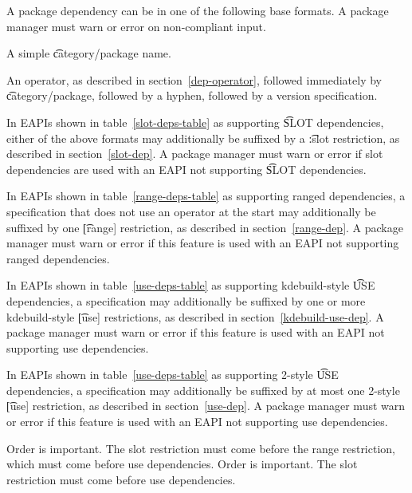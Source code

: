 A package dependency can be in one of the following base formats. A package manager must warn or
error on non-compliant input.

\begin{compactitem}
\item A simple \t{category/package} name.
\item An operator, as described in section~\ref{dep-operator}, followed immediately by
    \t{category/package}, followed by a hyphen, followed by a version specification.
\end{compactitem}

In EAPIs shown in table~\ref{slot-deps-table} as supporting \t{SLOT} dependencies, either of the
above formats may additionally be suffixed by a \t{:slot} restriction, as described in
section~\ref{slot-dep}. A package manager must warn or error if slot dependencies are used with an
EAPI not supporting \t{SLOT} dependencies.

\IFKDEBUILDELSE
{
    In EAPIs shown in table~\ref{range-deps-table} as supporting ranged dependencies, a
    specification that does not use an operator at the start may additionally be suffixed by one
    \t{[range]} restriction, as described in section~\ref{range-dep}. A package manager must warn or
    error if this feature is used with an EAPI not supporting ranged dependencies.
}{
}

\IFKDEBUILDELSE
{
    In EAPIs shown in table~\ref{use-deps-table} as supporting kdebuild-style \t{USE} dependencies,
    a specification may additionally be suffixed by one or more kdebuild-style \t{[use]}
    restrictions, as described in section~\ref{kdebuild-use-dep}. A package manager must warn or
    error if this feature is used with an EAPI not supporting use dependencies.
}{
}

In EAPIs shown in table~\ref{use-deps-table} as supporting 2-style \t{USE} dependencies, a specification
may additionally be suffixed by at most one 2-style \t{[use]} restriction, as described in
section~\ref{use-dep}. A package manager must warn or error if this feature is used with an EAPI
not supporting use dependencies.

\IFKDEBUILDELSE
{
    \note Order is important. The slot restriction must come before the range restriction, which
    must come before use dependencies.
}{
    \note Order is important. The slot restriction must come before use dependencies.
}

